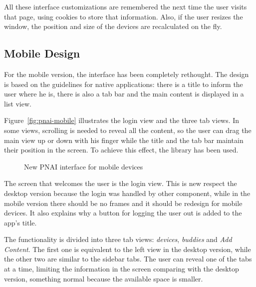 All these interface customizations are remembered the next time the user visits that page, using cookies to store that information.
Also, if the user resizes the window, the position and size of the devices are recalculated on the fly.


\subsection{Mobile Design} %
\label{sub:mobile_design}

For the mobile version, the interface has been completely rethought.
The design is based on the  guidelines for native applications: there is a title to inform the user where he is, there is also a tab bar and the main content is displayed in a list view.

Figure~\vref{fig:pnai-mobile} illustrates the login view and the three tab views.
In some views, scrolling is needed to reveal all the content, so the user can drag the main view up or down with his finger while the title and the tab bar maintain their position in the screen.
To achieve this effect, the  library has been used.

\begin{figure}[htbp]
  \centering
  \caption{New PNAI interface for mobile devices}
  \label{fig:pnai-mobile}
\end{figure}

The screen that welcomes the user is the login view.
This is new respect the desktop version because the login was handled by other component, while in the mobile version there should be no frames and it should be redesign for mobile devices.
It also explains why a button for logging the user out is added to the app's title.

The functionality is divided into three tab views: \emph{devices}, \emph{buddies} and \emph{Add Content}.
The first one is equivalent to the left view in the desktop version, while the other two are similar to the sidebar tabs.
The user can reveal one of the tabs at a time, limiting the information in the screen comparing with the desktop version, something normal because the available space is smaller.

